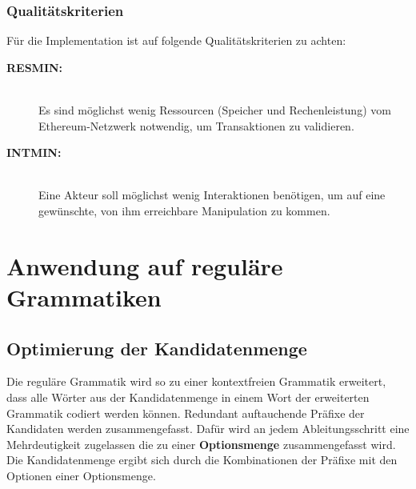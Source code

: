 \documentclass[]{article}
\begin{document}


\subsubsection*{Qualitätskriterien}

Für die Implementation ist auf folgende Qualitätskriterien zu achten:

\begin{description} 
  \item[\textbf{RESMIN:}]\hfill \\
    Es sind möglichst wenig Ressourcen (Speicher und Rechenleistung) vom Ethereum-Netzwerk notwendig, um Transaktionen zu validieren.
  \item[\textbf{INTMIN:}]\hfill \\
    Eine Akteur soll möglichst wenig Interaktionen benötigen, um auf eine gewünschte, von ihm erreichbare Manipulation zu kommen.
\end{description}

% 

% 





\section{Anwendung auf reguläre Grammatiken}

\subsection{Optimierung der Kandidatenmenge}
Die reguläre Grammatik wird so zu einer kontextfreien Grammatik erweitert, dass alle Wörter aus der Kandidatenmenge in einem Wort der erweiterten Grammatik codiert werden können. Redundant auftauchende Präfixe der Kandidaten werden zusammengefasst. Dafür wird an jedem Ableitungsschritt eine Mehrdeutigkeit zugelassen die zu einer \textbf{Optionsmenge} zusammengefasst wird. Die Kandidatenmenge ergibt sich durch die Kombinationen der Präfixe mit den Optionen einer Optionsmenge.
\end{document}
